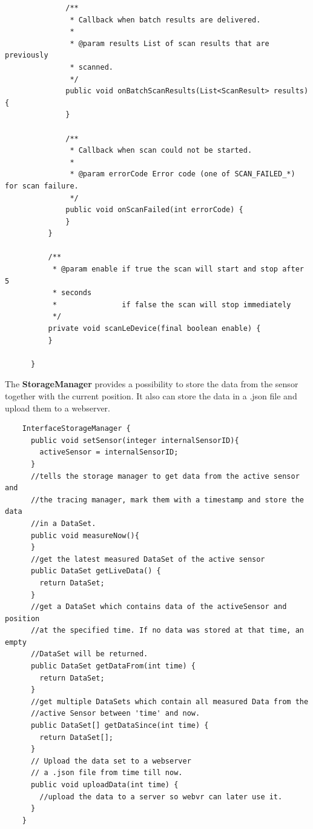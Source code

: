 \begin{lstlisting}
              /**
               * Callback when batch results are delivered.
               *
               * @param results List of scan results that are previously 
               * scanned.
               */
              public void onBatchScanResults(List<ScanResult> results) {
              }

              /**
               * Callback when scan could not be started.
               *
               * @param errorCode Error code (one of SCAN_FAILED_*) for scan failure.
               */
              public void onScanFailed(int errorCode) {
              }
          }

          /**
           * @param enable if true the scan will start and stop after 5 
           * seconds
           *               if false the scan will stop immediately
           */
          private void scanLeDevice(final boolean enable) {
          }

      }
    \end{lstlisting}

    \noindent The \textbf{StorageManager} provides a possibility to store the data from the sensor together with the current position.
    It also can store the data in a .json file and upload them to a webserver.

    \begin{lstlisting}
    InterfaceStorageManager {
      public void setSensor(integer internalSensorID){
        activeSensor = internalSensorID;
      }
      //tells the storage manager to get data from the active sensor and
      //the tracing manager, mark them with a timestamp and store the data
      //in a DataSet.
      public void measureNow(){
      }
      //get the latest measured DataSet of the active sensor
      public DataSet getLiveData() {
        return DataSet;
      }
      //get a DataSet which contains data of the activeSensor and position
      //at the specified time. If no data was stored at that time, an empty
      //DataSet will be returned.
      public DataSet getDataFrom(int time) {
        return DataSet;
      }
      //get multiple DataSets which contain all measured Data from the
      //active Sensor between 'time' and now.
      public DataSet[] getDataSince(int time) {
        return DataSet[];
      }
      // Upload the data set to a webserver
      // a .json file from time till now.
      public void uploadData(int time) {
        //upload the data to a server so webvr can later use it.
      }
    }
    \end{lstlisting}


